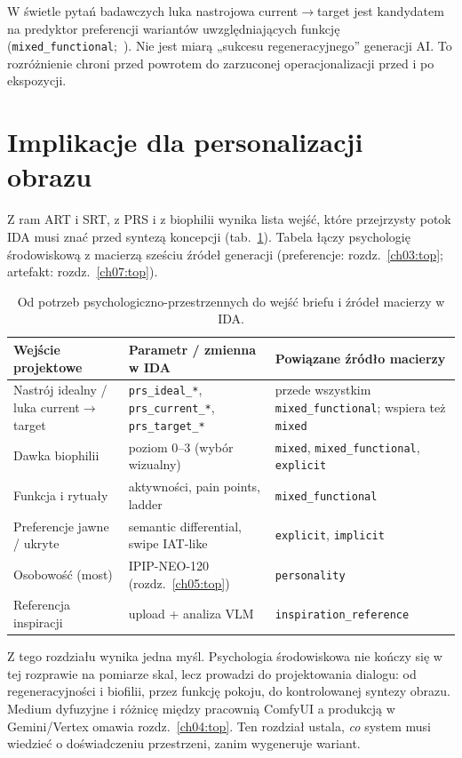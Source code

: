 W świetle pytań badawczych luka nastrojowa current$\rightarrow$target jest kandydatem na predyktor preferencji wariantów uwzględniających funkcję (\texttt{mixed\_functional};~). Nie jest miarą „sukcesu regeneracyjnego” generacji AI.
To rozróżnienie chroni przed powrotem do zarzuconej operacjonalizacji przed i po ekspozycji.

\section{Implikacje dla personalizacji obrazu}
\label{ch02:sec:implikacje}

Z ram ART i SRT, z PRS i z biophilii wynika lista wejść, które przejrzysty potok IDA musi znać przed syntezą koncepcji (tab.~\ref{tab:ch02:inputs-brief}).
Tabela łączy psychologię środowiskową z macierzą sześciu źródeł generacji (preferencje: rozdz.~\ref{ch03:top}; artefakt: rozdz.~\ref{ch07:top}).

\begin{table}[htbp]
  \centering
  \caption{Od potrzeb psychologiczno-przestrzennych do wejść briefu i źródeł macierzy w IDA.}
  \label{tab:ch02:inputs-brief}
  \begin{tabular}{@{}p{}p{}p{}@{}}
    \toprule
    Wejście projektowe & Parametr / zmienna w IDA & Powiązane źródło macierzy \\
    \midrule
    Nastrój idealny / luka current$\rightarrow$target
      & \texttt{prs\_ideal\_*}, \texttt{prs\_current\_*}, \texttt{prs\_target\_*}
      & przede wszystkim \texttt{mixed\_functional}; wspiera też \texttt{mixed} \\
    Dawka biophilii
      & poziom 0--3 (wybór wizualny)
      & \texttt{mixed}, \texttt{mixed\_functional}, \texttt{explicit} \\
    Funkcja i rytuały
      & aktywności, pain points, ladder
      & \texttt{mixed\_functional} \\
    Preferencje jawne / ukryte
      & semantic differential, swipe IAT-like
      & \texttt{explicit}, \texttt{implicit} \\
    Osobowość (most)
      & IPIP-NEO-120 (rozdz.~\ref{ch05:top})
      & \texttt{personality} \\
    Referencja inspiracji
      & upload + analiza VLM
      & \texttt{inspiration\_reference} \\
    \bottomrule
  \end{tabular}
\end{table}

Z tego rozdziału wynika jedna myśl. Psychologia środowiskowa nie kończy się w tej rozprawie na pomiarze skal, lecz prowadzi do projektowania dialogu: od regeneracyjności i biofilii, przez funkcję pokoju, do kontrolowanej syntezy obrazu.
Medium dyfuzyjne i różnicę między pracownią ComfyUI a produkcją w Gemini/Vertex omawia rozdz.~\ref{ch04:top}. Ten rozdział ustala, \emph{co} system musi wiedzieć o doświadczeniu przestrzeni, zanim wygeneruje wariant.
